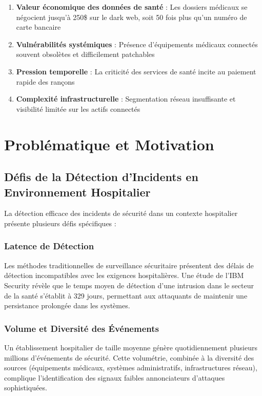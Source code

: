 \begin{enumerate}
    \item \textbf{Valeur économique des données de santé} : Les dossiers médicaux se négocient jusqu'à 250\$ sur le dark web, soit 50 fois plus qu'un numéro de carte bancaire
    \item \textbf{Vulnérabilités systémiques} : Présence d'équipements médicaux connectés souvent obsolètes et difficilement patchables
    \item \textbf{Pression temporelle} : La criticité des services de santé incite au paiement rapide des rançons
    \item \textbf{Complexité infrastructurelle} : Segmentation réseau insuffisante et visibilité limitée sur les actifs connectés
\end{enumerate}

\section{Problématique et Motivation}

\subsection{Défis de la Détection d'Incidents en Environnement Hospitalier}

La détection efficace des incidents de sécurité dans un contexte hospitalier présente plusieurs défis spécifiques :

\subsubsection{Latence de Détection}

Les méthodes traditionnelles de surveillance sécuritaire présentent des délais de détection incompatibles avec les exigences hospitalières. Une étude de l'IBM Security révèle que le temps moyen de détection d'une intrusion dans le secteur de la santé s'établit à 329 jours, permettant aux attaquants de maintenir une persistance prolongée dans les systèmes.

\subsubsection{Volume et Diversité des Événements}

Un établissement hospitalier de taille moyenne génère quotidiennement plusieurs millions d'événements de sécurité. Cette volumétrie, combinée à la diversité des sources (équipements médicaux, systèmes administratifs, infrastructures réseau), complique l'identification des signaux faibles annonciateurs d'attaques sophistiquées.

